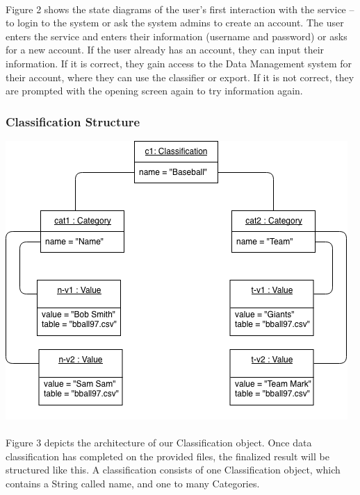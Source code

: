 \documentclass[12pt,oneside,letterpaper]{article}
\begin{document}
\paragraph{} Figure 2 shows the state diagrams of the user's first interaction with the service -- to login to the system or ask the system admins to create an account. The user enters the service and enters their information (username and password) or asks for a new account. If the user already has an account, they can input their information. If it is correct, they gain access to the Data Management system for their account, where they can use the classifier or export. If it is not correct, they are prompted with the opening screen again to try information again.

\subsubsection{Classification Structure}
\includegraphics[scale = 0.9]{spencer_object.png}
\begingroup
{}
\endgroup

\paragraph{} Figure 3 depicts the architecture of our Classification object. Once data classification has completed on the provided files, the finalized result will be structured like this. A classification consists of one Classification object, which contains a String called name, and one to many Categories. 
\end{document}
